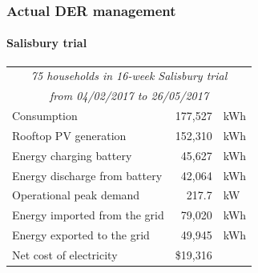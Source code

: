 \documentclass[handout, smaller, xcolor=table]{beamer}			%
\begin{document}
\begin{frame}
	\frametitle{Actual DER management}
	\framesubtitle{Salisbury trial}

	\begin{table}
	\centering
	\begin{tabular}{l r @{ } l}
		\toprule
		\multicolumn{3}{c}{\textit{75 households in 16-week Salisbury trial}}	\\
		\multicolumn{3}{c}{\textit{from 04/02/2017 to 26/05/2017}}	\\
		\midrule
		Consumption				& 177,527&kWh	\\
		Rooftop PV generation 		& 152,310&kWh	\\
		Energy charging battery		& 45,627&kWh		\\
		Energy discharge from battery	& 42,064&kWh		\\
		Operational peak demand		& 217.7&kW		\\
		Energy imported from the grid	& 79,020&kWh		\\
		Energy exported to the grid	& 49,945&kWh		\\
		Net cost of electricity			& \$19,316&		\\
		\bottomrule
	\end{tabular}
	\end{table}

\end{frame}
\end{document}
